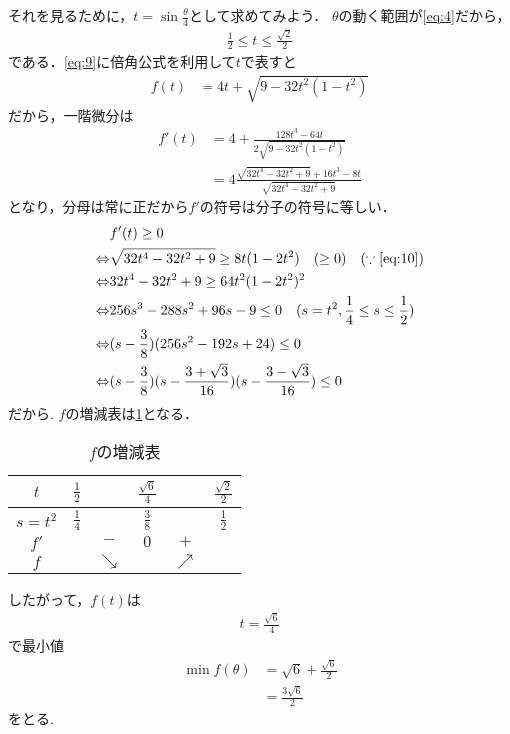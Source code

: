 \documentclass[a4paper,10pt]{ltjsarticle}
\begin{document}
\begin{multicols}{2}
  それを見るために，$t=\sin\frac{\theta}{4}$として求めてみよう．
  $\theta$の動く範囲が\cref{eq:4}だから，
  \begin{align}
    \frac{1}{2} \le t \le \frac{\sqrt{2}}{2} \label{eq:10}
  \end{align}
  である．\cref{eq:9}に倍角公式を利用して$t$で表すと
  \begin{align*}
    f(t) & = 4t + \sqrt{9-32t^2(1-t^2)}
  \end{align*}
  だから，一階微分は
  \begin{align*}
    f'(t)
     & = 4 + \frac{128t^3 - 64t}{2\sqrt{9-32t^2(1-t^2)}}              \\
     & = 4 \frac{\sqrt{32t^4-32t^2+9}+16t^3-8t}{\sqrt{32t^4-32t^2+9}}
  \end{align*}
  となり，分母は常に正だから$f'$の符号は分子の符号に等しい．
  \begin{align*}
                    & f'(t) \ge 0                                                                            \\
    \Leftrightarrow & \sqrt{32t^4-32t^2+9} \ge 8t(1-2t^2) \quad (\ge 0) \quad (\because \text{\cref{eq:10}}) \\
    \Leftrightarrow & 32t^4-32t^2+9 \ge 64t^2(1-2t^2)^2                                                      \\
    \Leftrightarrow & 256s^3-288s^2+96s-9 \le 0 \quad (s=t^2, \frac{1}{4} \le s \le \frac{1}{2})             \\
    \Leftrightarrow & (s-\frac{3}{8})(256s^2-192s+24) \le 0                                                  \\
    \Leftrightarrow & (s-\frac{3}{8})(s-\frac{3+\sqrt{3}}{16})(s-\frac{3-\sqrt{3}}{16}) \le 0
  \end{align*}
  だから. $f$の増減表は\cref{table:2}となる．
  \begin{table}[H]
    \centering
    \caption{$f$の増減表}
    \label{table:2}
    \begin{tabular}{|c||c|c|c|c|c|}
      \hline
      $t$     & $\frac{1}{2}$ &            & $\frac{\sqrt{6}}{4}$ &            & $\frac{\sqrt{2}}{2}$ \\
      \hline
      $s=t^2$ & $\frac{1}{4}$ &            & $\frac{3}{8}$        &            & $\frac{1}{2}$        \\
      \hline
      $f'$    &               & $-$        & $0$                  & $+$        &                      \\
      \hline
      $f$     &               & $\searrow$ &                      & $\nearrow$ &                      \\
      \hline
    \end{tabular}
  \end{table}
  したがって，$f(t)$は
  \begin{align*}
    t=\frac{\sqrt{6}}{4}
  \end{align*}
  で最小値
  \begin{align*}
    \min f(\theta)
     & = \sqrt{6}+\frac{\sqrt{6}}{2} \\
     & = \frac{3\sqrt{6}}{2}
  \end{align*}
  をとる.


  \newpage
\end{multicols}
\end{document}
